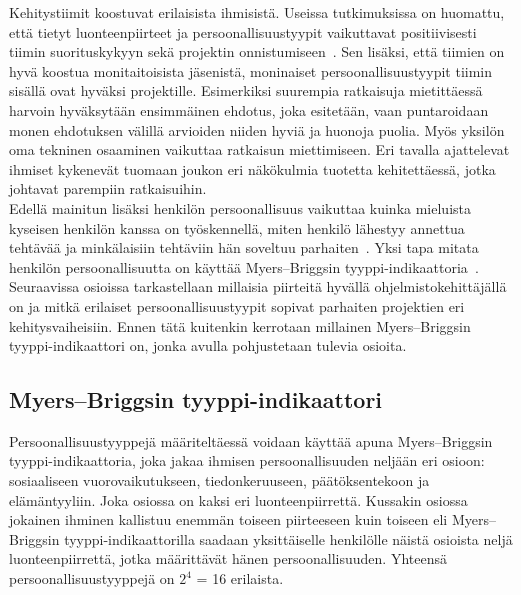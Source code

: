 \documentclass[finnish]{../tktltiki2}
\theoremstyle{definition}
\theoremstyle{remark}
\begin{document}
Kehitystiimit koostuvat erilaisista ihmisistä. Useissa tutkimuksissa on huomattu, että tietyt
luonteenpiirteet ja persoonallisuustyypit vaikuttavat positiivisesti tiimin suorituskykyyn sekä
projektin onnistumiseen~\cite{Acuna:2008:ESP:1414004.1414056,Capretz:2003:PTS:766407.766410,Capretz:2010:MSS:1726559.1726574,Gorla:2004:WWB:990680.990684}. Sen lisäksi, että tiimien on hyvä koostua monitaitoisista
jäsenistä, moninaiset persoonallisuustyypit tiimin sisällä ovat hyväksi
projektille. Esimerkiksi suurempia ratkaisuja mietittäessä harvoin hyväksytään
ensimmäinen ehdotus, joka esitetään, vaan puntaroidaan monen ehdotuksen
välillä arvioiden niiden hyviä ja huonoja puolia. Myös yksilön oma
tekninen osaaminen vaikuttaa ratkaisun miettimiseen. Eri tavalla ajattelevat ihmiset kykenevät tuomaan joukon
eri näkökulmia tuotetta kehitettäessä, jotka johtavat parempiin ratkaisuihin.\\

Edellä mainitun lisäksi henkilön persoonallisuus vaikuttaa
kuinka mieluista kyseisen henkilön kanssa on työskennellä,
miten henkilö lähestyy annettua tehtävää ja minkälaisiin tehtäviin
hän soveltuu parhaiten~\cite{Begel:2008:PPW:1414004.1414026,Capretz:2010:MSS:1726559.1726574}. Yksi tapa mitata henkilön persoonallisuutta on käyttää Myers--Briggsin tyyppi-indikaattoria~\cite{Capretz:2003:PTS:766407.766410,Capretz:2010:MSS:1726559.1726574,DaCunha:2007:PMA:1230819.1241672}.
Seuraavissa osioissa tarkastellaan millaisia piirteitä hyvällä
ohjelmistokehittäjällä on ja mitkä erilaiset persoonallisuustyypit
sopivat parhaiten projektien eri kehitysvaiheisiin. Ennen tätä kuitenkin kerrotaan millainen Myers--Briggsin tyyppi-indikaattori on, jonka avulla pohjustetaan tulevia osioita.

\subsection{Myers--Briggsin tyyppi-indikaattori}

Persoonallisuustyyppejä määriteltäessä voidaan käyttää apuna
Myers--Briggsin tyyppi-indikaattoria, joka jakaa ihmisen persoonallisuuden neljään eri osioon: sosiaaliseen vuorovaikutukseen, tiedonkeruuseen, päätöksentekoon ja elämän\-tyyliin. Joka osiossa on
kaksi eri luonteenpiirrettä. Kussakin osiossa jokainen ihminen kallistuu enemmän toiseen piirteeseen kuin toiseen eli Myers--Briggsin
tyyppi-indikaattorilla saadaan yksittäiselle henkilölle näistä osioista neljä luonteenpiirrettä, jotka määrittävät hänen persoonallisuuden. Yhteensä
persoonallisuustyyppejä on $2^4$ = 16 erilaista.
\end{document}
